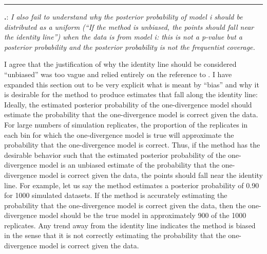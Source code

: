 \documentclass[12pt]{article}
\newcounter{commentCounter}
\newcommand{\revcomment}[1]{{\addtocounter{commentCounter}{1}}
    \medskip \hrule \noindent
\textbf{\arabic{section}.\arabic{commentCounter}}: {\sl #1}\par\xspace}
\newcommand{\response}[1]{{\addtolength{\leftskip}{0.25in} #1\par}\xspace}
\let\quoteOld\quote
\let\endquoteOld\endquote
\renewenvironment{quote}{\sffamily\small\quoteOld}{\endquoteOld}
\begin{document}
\revcomment{
    I also fail to understand why the posterior probability of model i should
    be distributed as a uniform (``If the method is unbiased, the points should
    fall near the identity line'') when the data is from model i: this is not a
    p-value but a posterior probability and the posterior probability is not
    the frequentist coverage.
}
\response{
    I agree that the justification of why the identity line should be considered
    ``unbiased'' was too vague and relied entirely on the reference to
    \cite{Huelsenbeck2004}. I have expanded this section out to be very
    explicit what is meant by ``bias'' and why it is desirable for the method
    to produce estimates that fall along the identity line:
    \begin{quote}
        Ideally, the estimated posterior probability of the one-divergence model
        should estimate the probability that the one-divergence model is
        correct given the data.  For large numbers of simulation replicates,
        the proportion of the replicates in each bin for which the
        one-divergence model is true will approximate the probability that the
        one-divergence model is correct.  Thus, if the method has the desirable
        behavior such that the estimated posterior probability of
        the one-divergence model is an unbiased estimate of the probability
        that the one-divergence model is correct given the data, the points
        should fall near the identity line.  For example, let us say the method
        estimates a posterior probability of 0.90 for 1000 simulated datasets.
        If the method is accurately estimating the probability that the
        one-divergence model is correct given the data, then the one-divergence
        model should be the true model in approximately 900 of the 1000
        replicates.  Any trend away from the identity line indicates the method
        is biased in the sense that it is not correctly estimating the
        probability that the one-divergence model is correct given the data.
    \end{quote}
}
\end{document}
